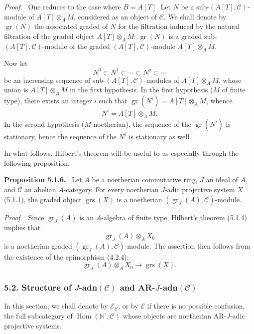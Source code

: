 \documentclass[11pt]{article}
\newenvironment{statement}[1]{\par\medskip\noindent\textbf{#1.}\ }{\par\medskip}
\newenvironment{prooftext}[1][Proof]{\par\noindent\emph{#1.}\ }{\par\medskip}
\DeclareMathOperator{\Hom}{Hom}
\providecommand{\gr}{\operatorname{gr}}
\providecommand{\Hom}{\operatorname{Hom}}
\providecommand{\gr}{\operatorname{gr}}
\providecommand{\gr}{\operatorname{gr}}
\providecommand{\grs}{\operatorname{grs}}
\begin{document}
\begin{prooftext}
One reduces to the case where \(B=A[T]\). Let \(N\) be a sub-\((A[T],\mathcal C)\)-module of \(A[T]\otimes_A M\), considered as an object of \(\mathcal C\). We shall denote by \(\gr(N)\) the associated graded of \(N\) for the filtration induced by the natural filtration of the graded object \(A[T]\otimes_A M\): \(\gr(N)\) is a graded sub-\((A[T],\mathcal C)\)-module of the graded \((A[T],\mathcal C)\)-module \(A[T]\otimes_A M\).

Now let
\[
N^0\subset N^1\subset\cdots\subset N^p\subset\cdots
\]
be an increasing sequence of sub-\((A[T],\mathcal C)\)-modules of \(A[T]\otimes_A M\), whose union is \(A[T]\otimes_A M\) in the first hypothesis. In the first hypothesis (\(M\) of finite type), there exists an integer \(i\) such that \(\gr(N^i)=A[T]\otimes_A M\), whence
\[
N^i=A[T]\otimes_A M.
\]
In the second hypothesis (\(M\) noetherian), the sequence of the \(\gr(N^i)\) is stationary, hence the sequence of the \(N^i\) is stationary as well.

In what follows, Hilbert's theorem will be useful to us especially through the following proposition.
\end{prooftext}

\begin{statement}{Proposition 5.1.6}
Let \(A\) be a noetherian commutative ring, \(J\) an ideal of \(A\), and \(\mathcal C\) an abelian \(A\)-category. For every noetherian \(J\)-adic projective system \(X\) (5.1.1), the graded object \(\grs(X)\) is a noetherian \((\gr_J(A),\mathcal C)\)-module.
\end{statement}

\begin{prooftext}
Since \(\gr_J(A)\) is an \(A\)-algebra of finite type, Hilbert's theorem (5.1.4) implies that
\[
\gr_J(A)\otimes_A X_0
\]
is a noetherian graded \((\gr_J(A),\mathcal C)\)-module. The assertion then follows from the existence of the epimorphism (4.2.4):
\[
\gr_J(A)\otimes_A X_0\longrightarrow \grs(X).
\]
\end{prooftext}

\subsubsection*{5.2. Structure of \(J\)-adn\((\mathcal C)\) and AR-\(J\)-adn\((\mathcal C)\)}

In this section, we shall denote by \(\mathcal E_{\mathcal C}\), or by \(\mathcal E\) if there is no possible confusion, the full subcategory of \(\Hom(\mathbb N^\circ,\mathcal C)\) whose objects are noetherian AR-\(J\)-adic projective systems.
\end{document}
